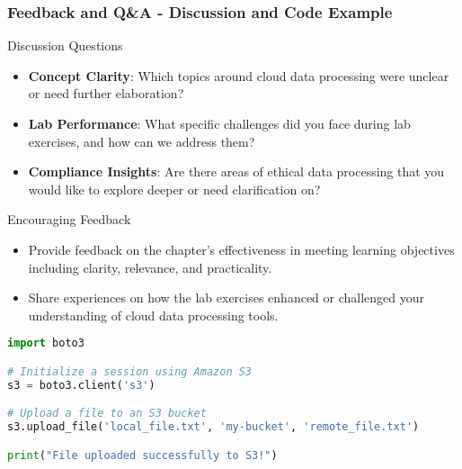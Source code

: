 \documentclass[aspectratio=169]{beamer}
\begin{document}
\begin{frame}[fragile]
    \frametitle{Feedback and Q\&A - Discussion and Code Example}
    \begin{block}{Discussion Questions}
        \begin{itemize}
            \item \textbf{Concept Clarity}: Which topics around cloud data processing were unclear or need further elaboration?
            \item \textbf{Lab Performance}: What specific challenges did you face during lab exercises, and how can we address them?
            \item \textbf{Compliance Insights}: Are there areas of ethical data processing that you would like to explore deeper or need clarification on?
        \end{itemize}
    \end{block}

    \begin{block}{Encouraging Feedback}
        \begin{itemize}
            \item Provide feedback on the chapter's effectiveness in meeting learning objectives including clarity, relevance, and practicality.
            \item Share experiences on how the lab exercises enhanced or challenged your understanding of cloud data processing tools.
        \end{itemize}
    \end{block}

    \begin{lstlisting}[language=Python, caption={Example: Loading Data into AWS S3}]
import boto3

# Initialize a session using Amazon S3
s3 = boto3.client('s3')

# Upload a file to an S3 bucket
s3.upload_file('local_file.txt', 'my-bucket', 'remote_file.txt')

print("File uploaded successfully to S3!")
    \end{lstlisting}
\end{frame}
\end{document}
